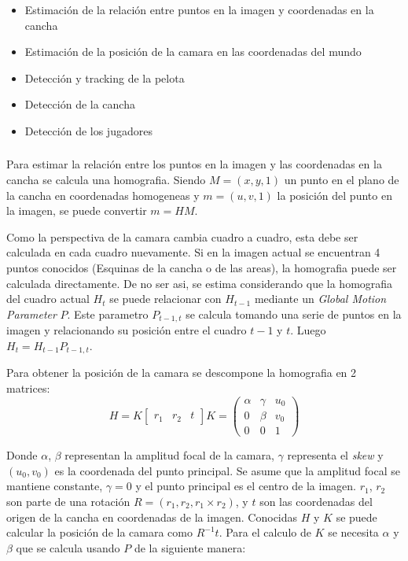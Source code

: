 \documentclass[a4paper,10pt]{article}
\begin{document}
\begin{itemize}
  \item Estimación de la relación entre puntos en la imagen y coordenadas en la cancha
  \item Estimación de la posición de la camara en las coordenadas del mundo
  \item Detección y tracking de la pelota
  \item Detección de la cancha
  \item Detección de los jugadores
\end{itemize}

\subsubsection{}


Para estimar la relación entre los puntos en la imagen y las coordenadas en la cancha se calcula una homografia.
Siendo $M = (x, y, 1)$ un punto en el plano de la cancha en coordenadas homogeneas y $m = (u, v, 1)$ la posición del punto en la imagen, se puede convertir $ m = H M $.

Como la perspectiva de la camara cambia cuadro a cuadro, esta debe ser calculada en cada cuadro nuevamente.
Si en la imagen actual se encuentran 4 puntos conocidos (Esquinas de la cancha o de las areas), la homografia puede ser calculada directamente.
De no ser asi, se estima considerando que la homografia del cuadro actual $H_t$ se puede relacionar con $H_{t-1}$ mediante un \textit{Global Motion Parameter} $P$.
Este parametro $P_{t-1,t}$ se calcula tomando una serie de puntos en la imagen y relacionando su posición entre el cuadro $t-1$ y $t$.
Luego $ H_t = H_{t-1} P_{t-1,t}$.

Para obtener la posición de la camara se descompone la homografia en 2 matrices:
\begin{equation}
H = K \begin{bmatrix} r_1 & r_2 & t \end{bmatrix}
K = \begin{pmatrix}
    \alpha & \gamma & u_0 \\
    0 & \beta & v_0 \\
    0 & 0 & 1
    \end{pmatrix}
\end{equation}

Donde $\alpha$, $\beta$ representan la amplitud focal de la camara, $\gamma$ representa el \textit{skew} y $(u_0, v_0)$ es la coordenada del punto principal.
Se asume que la amplitud focal se mantiene constante, $\gamma = 0$ y el punto principal es el centro de la imagen.
$r_1$, $r_2$ son parte de una rotación $R = (r_1, r_2, r_1 \times r_2)$, y $t$ son las coordenadas del origen de la cancha en coordenadas de la imagen.
Conocidas $H$ y $K$ se puede calcular la posición de la camara como $R^{-1} t$.
Para el calculo de $K$ se necesita $\alpha$ y $\beta$ que se calcula usando $P$ de la siguiente manera:
\end{document}
